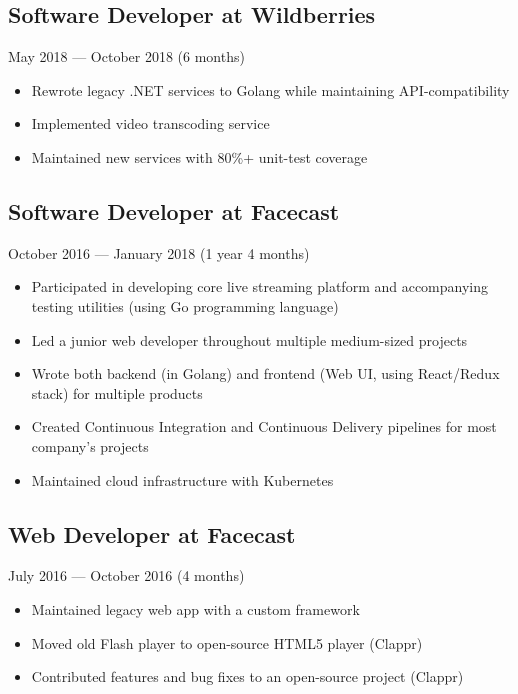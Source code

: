 \documentclass[a4paper,11pt]{article}
\begin{document}
\subsection{Software Developer at Wildberries}
May 2018 --- October 2018 (6 months)
\begin{itemize}[noitemsep]
    \renewcommand{\labelitemi}{---}

    \item Rewrote legacy .NET services to Golang while maintaining API-compatibility
    \item Implemented video transcoding service
    \item Maintained new services with 80\%+ unit-test coverage
\end{itemize}

\subsection{Software Developer at Facecast}
October 2016 --- January 2018 (1 year 4 months)
\begin{itemize}[noitemsep]
    \renewcommand{\labelitemi}{---}

    \item Participated in developing core live streaming platform and accompanying testing utilities (using Go programming language)
    \item Led a junior web developer throughout multiple medium-sized projects
    \item Wrote both backend (in Golang) and frontend (Web UI, using React/Redux stack) for multiple products
    \item Created Continuous Integration and Continuous Delivery pipelines for most company's projects
    \item Maintained cloud infrastructure with Kubernetes
\end{itemize}

\subsection{Web Developer at Facecast}
July 2016 --- October 2016 (4 months)
\begin{itemize}[noitemsep]
    \renewcommand{\labelitemi}{---}

    \item Maintained legacy web app with a custom framework
    \item Moved old Flash player to open-source HTML5 player (Clappr)
    \item Contributed features and bug fixes to an open-source project (Clappr)
\end{itemize}
\end{document}
